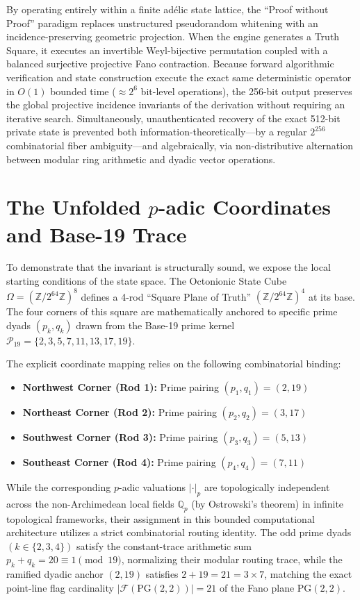 \documentclass[11pt, a4paper]{article}
\begin{document}
By operating entirely within a finite ad\'{e}lic state lattice, the ``Proof without Proof'' paradigm replaces unstructured pseudorandom whitening with an incidence-preserving geometric projection. When the engine generates a Truth Square, it executes an invertible Weyl-bijective permutation coupled with a balanced surjective projective Fano contraction. Because forward algorithmic verification and state construction execute the exact same deterministic operator in $O(1)$ bounded time ($\approx 2^6$ bit-level operations), the 256-bit output preserves the global projective incidence invariants of the derivation without requiring an iterative search. Simultaneously, unauthenticated recovery of the exact 512-bit private state is prevented both information-theoretically---by a regular $2^{256}$ combinatorial fiber ambiguity---and algebraically, via non-distributive alternation between modular ring arithmetic and dyadic vector operations.

\section{The Unfolded \texorpdfstring{$p$}{p}-adic Coordinates and Base-19 Trace}

To demonstrate that the invariant is structurally sound, we expose the local starting conditions of the state space. The Octonionic State Cube $\Omega = (\mathbb{Z}/2^{64}\mathbb{Z})^8$ defines a 4-rod ``Square Plane of Truth'' $(\mathbb{Z}/2^{64}\mathbb{Z})^4$ at its base. The four corners of this square are mathematically anchored to specific prime dyads $(p_k, q_k)$ drawn from the Base-19 prime kernel $\mathcal{P}_{19} = \{2, 3, 5, 7, 11, 13, 17, 19\}$. 

The explicit coordinate mapping relies on the following combinatorial binding:
\begin{itemize}
    \item \textbf{Northwest Corner (Rod 1):} Prime pairing $(p_1, q_1) = (2, 19)$
    \item \textbf{Northeast Corner (Rod 2):} Prime pairing $(p_2, q_2) = (3, 17)$
    \item \textbf{Southwest Corner (Rod 3):} Prime pairing $(p_3, q_3) = (5, 13)$
    \item \textbf{Southeast Corner (Rod 4):} Prime pairing $(p_4, q_4) = (7, 11)$
\end{itemize}

While the corresponding $p$-adic valuations $|\cdot|_p$ are topologically independent across the non-Archimedean local fields $\mathbb{Q}_p$ (by Ostrowski's theorem) in infinite topological frameworks, their assignment in this bounded computational architecture utilizes a strict combinatorial routing identity. The odd prime dyads $(k \in \{2, 3, 4\})$ satisfy the constant-trace arithmetic sum $p_k + q_k = 20 \equiv 1 \pmod{19}$, normalizing their modular routing trace, while the ramified dyadic anchor $(2,19)$ satisfies $2 + 19 = 21 = 3 \times 7$, matching the exact point-line flag cardinality $|\mathcal{F}(\mathrm{PG}(2,2))| = 21$ of the Fano plane $\mathrm{PG}(2,2)$.
\end{document}
